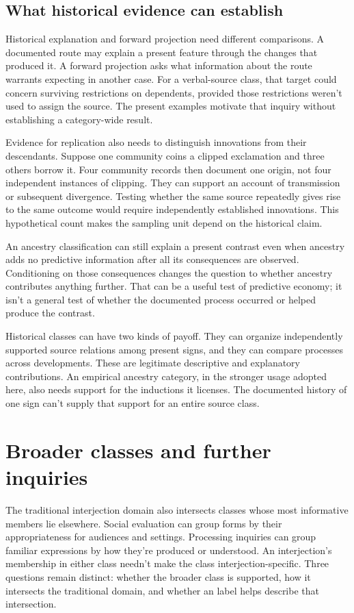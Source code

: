 \documentclass[12pt]{article}
\begin{document}
\subsection{What historical evidence can establish}

Historical explanation and forward projection need different comparisons.
A documented route may explain a present feature through the changes
that produced it. A forward projection asks what information about the
route warrants expecting in another case. For a verbal-source class,
that target could concern surviving restrictions on dependents, provided
those restrictions weren't used to assign the source. The present
examples motivate that inquiry without establishing a category-wide result.

Evidence for replication also needs to distinguish innovations from their
descendants. Suppose one community coins a clipped exclamation and
three others borrow it. Four community records then document one
origin, not four independent instances of clipping. They can support
an account of transmission or subsequent divergence. Testing whether
the same source repeatedly gives rise to the same outcome would
require independently established innovations. This hypothetical count
makes the sampling unit depend on the historical claim.

An ancestry classification can still explain a present contrast even
when ancestry adds no predictive information after all its consequences
are observed. Conditioning on those consequences changes the question
to whether ancestry contributes anything further. That can be a useful
test of predictive economy; it isn't a general test of whether the
documented process occurred or helped produce the contrast.

Historical classes can have two kinds of payoff. They can
organize independently supported source relations among present signs,
and they can compare processes across developments. These are legitimate
descriptive and explanatory contributions. An empirical ancestry category,
in the stronger usage adopted here, also needs support for the
inductions it licenses. The documented history of one sign can't supply
that support for an entire source class.

\section{Broader classes and further inquiries}\label{sec:extensions}

The traditional interjection domain also intersects classes whose most
informative members lie elsewhere. Social evaluation can group forms
by their appropriateness for audiences and settings. Processing inquiries
can group familiar expressions by how they're produced or understood.
An interjection's membership in either class needn't make the class
interjection-specific. Three questions remain distinct: whether the
broader class is supported, how it intersects the traditional domain,
and whether an  label helps describe that intersection.
\end{document}
